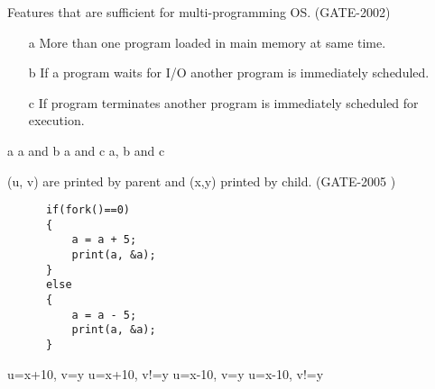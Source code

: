 
\begin{minipage}{\linewidth}

  \question  Features that are sufficient for multi-programming OS. (GATE-2002)

   \begin{enumerate}
      \item[a] More than one program loaded in main memory at same time.
      \item[b] If a program waits for I/O another program is immediately scheduled.
      \item[c] If program terminates another program is immediately scheduled for execution.
   \end{enumerate}

  \begin{choices}
    \choice a
    \choice a and b
    \choice a and c
    \choice a, b and c
  \end{choices}

\end{minipage}


\begin{minipage}{\linewidth}

  \question  (u, v) are printed by parent and (x,y) printed by child. (GATE-2005 )

    \begin{lstlisting}
      if(fork()==0)
      {
          a = a + 5;
          print(a, &a);
      }
      else
      {
          a = a - 5;
          print(a, &a);
      }
    \end{lstlisting}

  \begin{choices}
    \choice u=x+10, v=y
    \choice u=x+10, v!=y
    \choice u=x-10, v=y
    \choice u=x-10, v!=y
  \end{choices}

  \end{minipage}


\begin{comment}

\begin{minipage}{\linewidth}

  \question  (GATE- )

  \begin{choices}
    \choice
    \choice
    \choice
    \choice
  \end{choices}

\end{minipage}


\end{comment}
